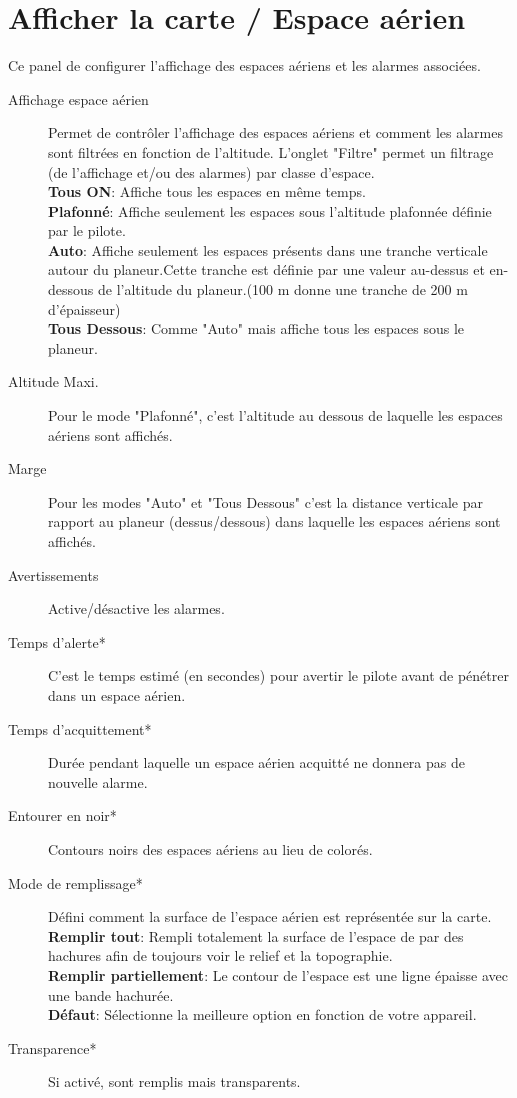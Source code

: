 \section{Afficher la carte / Espace aérien}

Ce panel de configurer l'affichage des espaces aériens et les alarmes associées.

\begin{description}
\item[Affichage espace aérien]  Permet de contrôler l'affichage des espaces aériens et comment les alarmes sont filtrées en fonction de l'altitude. L'onglet "Filtre" permet un filtrage (de l'affichage et/ou des alarmes) par classe d'espace. \\
  {\bf Tous ON}: Affiche tous les espaces en même temps. \\
  {\bf Plafonné}: Affiche seulement les espaces sous l'altitude plafonnée définie par le pilote.\\
  {\bf Auto}: Affiche seulement les espaces présents dans une tranche verticale autour du planeur.Cette tranche est définie par une valeur au-dessus et en-dessous de l'altitude du planeur.(100 m donne une tranche de 200 m d'épaisseur)\\
  {\bf Tous Dessous}:  Comme "Auto" mais affiche tous les espaces sous le planeur.
\item[Altitude Maxi.] Pour le mode "Plafonné", c'est l'altitude au dessous de laquelle les espaces aériens sont affichés.
\item[Marge]  Pour les modes "Auto" et "Tous Dessous" c'est la distance verticale par rapport au planeur (dessus/dessous) dans laquelle les espaces aériens sont affichés.
\item[Avertissements]  Active/désactive les alarmes.
\item[Temps d'alerte*]  C'est le temps estimé (en secondes) pour avertir le pilote avant de pénétrer dans un espace aérien.
\item[Temps d'acquittement*]  Durée pendant laquelle un espace aérien acquitté ne donnera pas de nouvelle alarme.
\item[Entourer en noir*]  Contours noirs des espaces aériens au lieu de colorés.
\item[Mode de remplissage*]  Défini comment la surface de l'espace aérien est représentée sur la carte.\\
  {\bf Remplir tout}: Rempli totalement la surface de l'espace de par des hachures afin de toujours voir le relief et la topographie.\\
  {\bf Remplir partiellement}: Le contour de l'espace est une ligne épaisse avec une bande hachurée. \\
  {\bf Défaut}:  Sélectionne la meilleure option en fonction de votre appareil. 
\item[Transparence*]  Si activé, sont remplis mais transparents.
\end{description}

